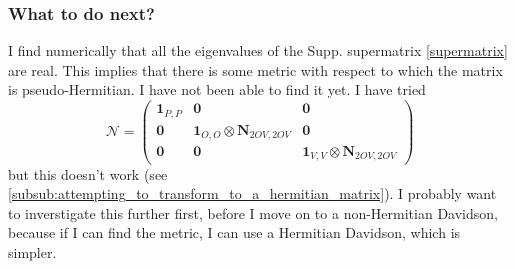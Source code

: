 \subsubsection{What to do next?}
I find numerically that all the eigenvalues of the Supp. supermatrix \ref{supermatrix} are real. This implies that there is some metric with respect to which the matrix is pseudo-Hermitian. I have not been able to find it yet. I have tried
\begin{equation}
    \bm{\mathcal{N}} = \begin{pmatrix}
\bm{1}_{P,P} & \bm{0} & \bm{0} \\
\bm{0} & \bm{1}_{O,O} \otimes \bm{N}_{2OV,2OV} & \bm{0} \\
\bm{0} & \bm{0} & \bm{1}_{V,V} \otimes \bm{N}_{2OV,2OV}
\end{pmatrix}
\end{equation}
but this doesn't work (see \ref{subsub:attempting_to_transform_to_a_hermitian_matrix}). I probably want to inverstigate this further first, before I move on to a non-Hermitian Davidson, because if I can find the metric, I can use a Hermitian Davidson, which is simpler.
